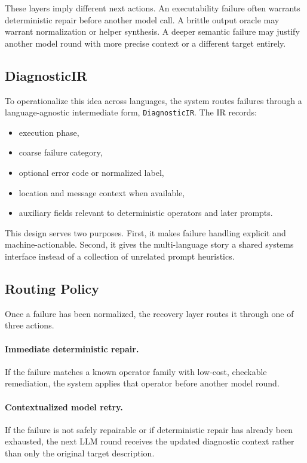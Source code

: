 \documentclass[10pt]{article}
\begin{document}
These layers imply different next actions. An executability failure often warrants deterministic repair before another model call. A brittle output oracle may warrant normalization or helper synthesis. A deeper semantic failure may justify another model round with more precise context or a different target entirely.

\subsection{DiagnosticIR}

To operationalize this idea across languages, the system routes failures through a language-agnostic intermediate form, \texttt{DiagnosticIR}. The IR records:

\begin{itemize}[leftmargin=1.4em]
    \item execution phase,
    \item coarse failure category,
    \item optional error code or normalized label,
    \item location and message context when available,
    \item auxiliary fields relevant to deterministic operators and later prompts.
\end{itemize}

This design serves two purposes. First, it makes failure handling explicit and machine-actionable. Second, it gives the multi-language story a shared systems interface instead of a collection of unrelated prompt heuristics.

\subsection{Routing Policy}

Once a failure has been normalized, the recovery layer routes it through one of three actions.

\paragraph{Immediate deterministic repair.}
If the failure matches a known operator family with low-cost, checkable remediation, the system applies that operator before another model round.

\paragraph{Contextualized model retry.}
If the failure is not safely repairable or if deterministic repair has already been exhausted, the next LLM round receives the updated diagnostic context rather than only the original target description.
\end{document}
